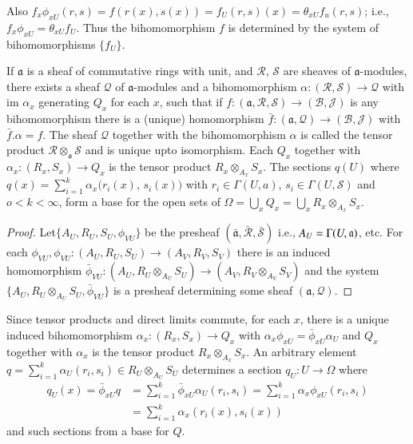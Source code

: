 Also $f_x \phi_{xU}(r, s) = f(r (x), s(x)) = f_U(r, s) (x) =
\theta_{xU}f_u (r, s)$; i.e., $f_x \phi_{xU} = \theta_{xU}
f_U$. Thus the bihomomorphism $f$ is determined by the system of
bihomomorphisms $\{f_U \}$. 

\begin{proposition}%
 If $\mathfrak{a}$ is a sheaf of commutative rings with unit, and
  $\mathscr{R}$, $\mathscr{S}$ are sheaves of $\mathfrak{a}$-modules,
 there exists a sheaf $\mathscr{Q}$ of $\mathfrak{a}$-modules and a
 bihomomorphism $\alpha : 
  (\mathscr{R},\mathscr{S}) \to \mathscr{Q}$ with im $\alpha_x$
  generating $Q_x$ for each $x$, such that if $f: (\mathfrak{a},
  \mathscr{R},\mathscr{S}) \to (\mathscr{B},\mathscr{J})$ is any
  bihomomorphism there is a (unique) homomorphism $\bar{f}: (\mathfrak{a},
  \mathscr{Q}) \to (\mathscr{B}, \mathscr{J})$ with $\bar{f}. \alpha =
  f$. The sheaf $\mathscr{Q}$ together with the bihomomorphism $\alpha$
  is called the tensor product $\mathscr{R} \otimes_{\mathfrak{a}}
  \mathscr{S}$ and is unique upto isomorphism. Each $Q_x$ together
  with $\alpha_x :   (R_x, S_x) \to Q_x$ is the tensor product $R_x
  \otimes_{A_x}S_x$. The sections $q(U)$ where $q(x)= \sum^k_{i=1}
  \alpha_x (r_i (x)$, $s_i(x))$ with $r_i \in \Gamma (U, a)$, $s_i
  \in \Gamma (U,\mathscr{S})$ and $o < k < \infty$, form a base for
  the open sets of $\Omega = \bigcup_x Q_x = \bigcup_x R_x
  \otimes_{A_x} S_x$. 
\end{proposition}

\begin{proof}
Let\pageoriginale $\{A_U, R_U, S_U, \phi_{VU}\}$ be the presheaf
$(\bar{\mathfrak{a}}, 
\bar{\mathscr{R}}, \bar{\mathscr{S}})$ i.e., $A_U =\break \Gamma (U,\mathfrak{a})$,
etc. For each $\phi_{VU}, \phi_{VU}: (A_U, R_U, S_U) \to (A_V, R_V,
S_V)$ there is an induced homomorphism $\bar{\phi}_{VU}: (A_U, R_U
\otimes_{A_U}S_U) \to (A_V, R_V \otimes_{A_V}S_V)$ and the system
$\bigg\{A_U, R_U \otimes_{A_U} S_U, \bar{\phi}_{VU}\bigg\}$ is a
presheaf determining some sheaf $(\mathfrak{a},\mathscr{Q})$. 
\end{proof}

Since tensor products and direct limits commute, for each $x$, there
is a unique induced bihomomorphism $\alpha_x : (R_x, S_x) \to Q_x$
with $\alpha_x \phi_{xU}= \bar{\phi}_{xU} \alpha_U$ and $Q_x$
together with $\alpha_x$ is the tensor product $R_x \otimes_{A_x}
S_x$. An arbitrary element $q= \sum^k_{i=1} \alpha_U (r_i, s_i) \in
R_U \otimes_{A_U} S_U$ determines a section $q_U : U \to \Omega$ where 
\begin{align*}
q_U (x)=\bar{\phi}_{xU} q & = \sum^k_{i=1} \bar{\phi}_{xU} \alpha_U
(r_i, s_i) = \sum^k_{i=1} \alpha_x \phi_{xU}(r_i, s_i)\\ 
& = \sum^k_{i=1} \alpha_x (r_i (x), s_i(x)) 
\end{align*}
and such sections from a base for $Q$.

